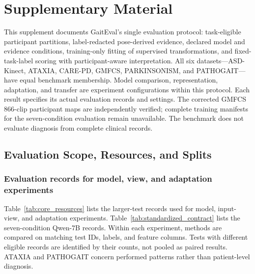 \appendix
\setcounter{section}{0}
\setcounter{subsection}{0}
\setcounter{subsubsection}{0}
\setcounter{table}{0}
\setcounter{figure}{0}
\renewcommand{\thesection}{S\arabic{section}}
\renewcommand{\thesubsection}{\thesection.\arabic{subsection}}
\renewcommand{\thesubsubsection}{\thesubsection.\arabic{subsubsection}}
\renewcommand{\thetable}{S\arabic{table}}
\renewcommand{\thefigure}{S\arabic{figure}}

\section{Supplementary Material}
\label{sec:supp}

This supplement documents GaitEval's single evaluation protocol: task-eligible participant partitions, label-redacted pose-derived evidence, declared model and evidence conditions, training-only fitting of supervised transformations, and fixed-task-label scoring with participant-aware interpretation. All six datasets---ASD-Kinect, ATAXIA, CARE-PD, GMFCS, PARKINSONISM, and PATHOGAIT---have equal benchmark membership. Model comparison, representation, adaptation, and transfer are experiment configurations within this protocol. Each result specifies its actual evaluation records and settings. The corrected GMFCS 866-clip participant maps are independently verified; complete training manifests for the seven-condition evaluation remain unavailable. The benchmark does not evaluate diagnosis from complete clinical records.

\subsection{Evaluation Scope, Resources, and Splits}
\label{sec:supp_scope}

\subsubsection{Evaluation records for model, view, and adaptation experiments}

Table~\ref{tab:core_resources} lists the larger-test records used for model, input-view, and adaptation experiments. Table~\ref{tab:standardized_contract} lists the seven-condition Qwen-7B records. Within each experiment, methods are compared on matching test IDs, labels, and feature columns. Tests with different eligible records are identified by their counts, not pooled as paired results. ATAXIA and PATHOGAIT concern performed patterns rather than patient-level diagnosis.

